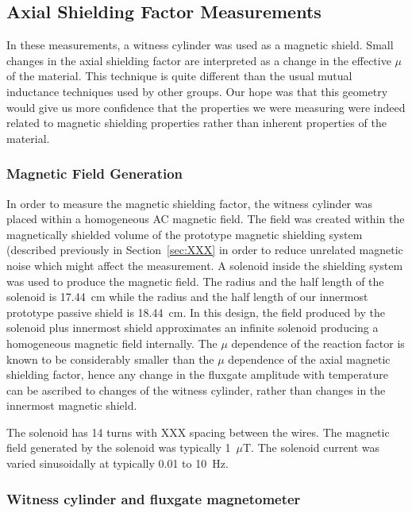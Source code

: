
\subsection{Axial Shielding Factor Measurements}

In these measurements, a witness cylinder was used as a magnetic
shield.  Small changes in the axial shielding factor are interpreted
as a change in the effective $\mu$ of the material.  This technique is
quite different than the usual mutual inductance techniques used by
other groups.  Our hope was that this geometry would give us more
confidence that the properties we were measuring were indeed related
to magnetic shielding properties rather than inherent properties of
the material.

\subsubsection{Magnetic Field Generation}

In order to measure the magnetic shielding factor, the witness
cylinder was placed within a homogeneous AC magnetic field.  The field
was created within the magnetically shielded volume of the prototype
magnetic shielding system (described previously in
Section~\ref{sec:XXX} in order to reduce unrelated magnetic noise
which might affect the measurement.  A solenoid inside the shielding
system was used to produce the magnetic field.  The radius and the
half length of the solenoid is 17.44~cm while the radius and the half
length of our innermost prototype passive shield is 18.44~cm.  In this
design, the field produced by the solenoid plus innermost shield
approximates an infinite solenoid producing a homogeneous magnetic
field internally.  The $\mu$ dependence of the reaction factor is
known to be considerably smaller than the $\mu$ dependence of the
axial magnetic shielding factor, hence any change in the fluxgate
amplitude with temperature can be ascribed to changes of the witness
cylinder, rather than changes in the innermost magnetic shield.

The solenoid has 14 turns with XXX spacing between the wires.  The
magnetic field generated by the solenoid was typically 1~$\mu$T.  The
solenoid current was varied sinusoidally at typically 0.01 to 10~Hz.

\subsubsection{Witness cylinder and fluxgate magnetometer}

